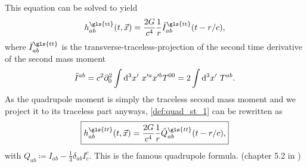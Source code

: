 This equation can be solved to yield
\begin{equation}
h_{ab}^\text{\gls{tt}}\lr{t,\vec{x}}=\frac{2 G}{c^4}\frac{1}{r}\ddot{I}_{ab}^\text{\gls{tt}}\lr{t-r/c},
\end{equation}
where $\ddot{I}_{ab}^\text{\gls{tt}}$ is the transverse-traceless-projection of the second time derivative of the second mass moment
\begin{equation}\label{def:quad_st_1}
\ddot{I}^{ab}=c^2\partial_0^2 \int\mathop{}\!\mathrm{d^3}x'\ x'^a x'^b T^{00} = 2\int\mathop{}\!\mathrm{d^3}x'\ T^{ab}.
\end{equation}
As the quadrupole moment is simply the traceless second mass moment and we project it to its traceless part anyways, \eqref{def:quad_st_1} can be rewritten as
\begin{equation}\label{def:h_quadrupole}
\boxed{h^{\gls{tt}}_{ab}\lr{t,\vec{x}} = \frac{2 G}{c^4}\frac{1}{r}\ddot{Q}^{\gls{tt}}_{ab}\lr{t-r/c},}
\end{equation}
with $Q_{ab}\coloneqq I_{ab} - \frac{1}{3}\delta_{ab}I^c_c$. This is the famous quadrupole formula. (chapter 5.2 in \cite{bachelor})\medskip\\

